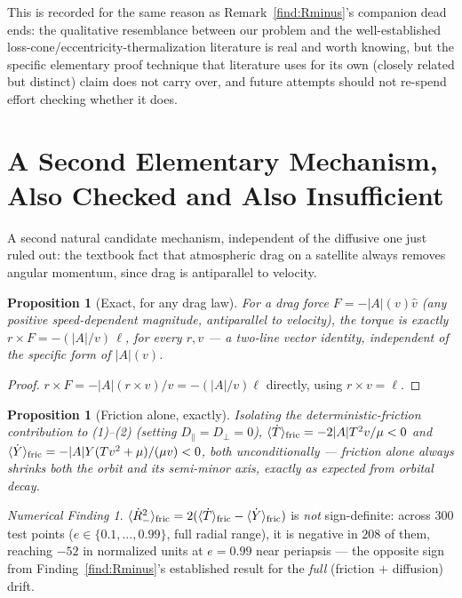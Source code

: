 \documentclass[12pt]{amsart}
\theoremstyle{plain}
\newtheorem{proposition}[theorem]{Proposition}
\theoremstyle{remark}
\newtheorem*{finding}{Numerical Finding}
\begin{document}
This is recorded for the same reason as Remark~\ref{find:Rminus}'s companion dead ends: the qualitative resemblance between our problem and the well-established loss-cone/eccentricity-thermalization literature is real and worth knowing, but the specific elementary proof technique that literature uses for its own (closely related but distinct) claim does not carry over, and future attempts should not re-spend effort checking whether it does.

\section{A Second Elementary Mechanism, Also Checked and Also Insufficient}

A second natural candidate mechanism, independent of the diffusive one just ruled out: the textbook fact that atmospheric drag on a satellite always removes angular momentum, since drag is antiparallel to velocity.

\begin{proposition}[Exact, for any drag law]\label{prop:torque}
For a drag force $F=-|A|(v)\hat v$ (any positive speed-dependent magnitude, antiparallel to velocity), the torque is exactly $r\times F=-(|A|/v)\,\ell$, for every $r,v$ --- a two-line vector identity, independent of the specific form of $|A|(v)$.
\end{proposition}

\begin{proof}
$r\times F=-|A|(r\times v)/v=-(|A|/v)\ell$ directly, using $r\times v=\ell$.
\end{proof}

\begin{proposition}[Friction alone, exactly]\label{prop:fric_only}
Isolating the deterministic-friction contribution to (1)--(2) (setting $D_\parallel=D_\perp=0$), $\langle\dot T\rangle_{\rm fric}=-2|A|T^2v/\mu<0$ and $\langle\dot Y\rangle_{\rm fric}=-|A|Y(Tv^2+\mu)/(\mu v)<0$, both unconditionally --- friction alone always shrinks both the orbit and its semi-minor axis, exactly as expected from orbital decay.
\end{proposition}

\begin{finding}\label{find:fric_fails}
$\langle\dot R_-^2\rangle_{\rm fric}=2(\langle\dot T\rangle_{\rm fric}-\langle\dot Y\rangle_{\rm fric})$ is \emph{not} sign-definite: across $300$ test points ($e\in\{0.1,\dots,0.99\}$, full radial range), it is negative in $208$ of them, reaching $-52$ in normalized units at $e=0.99$ near periapsis --- the opposite sign from Finding~\ref{find:Rminus}'s established result for the \emph{full} (friction $+$ diffusion) drift.
\end{finding}
\end{document}
